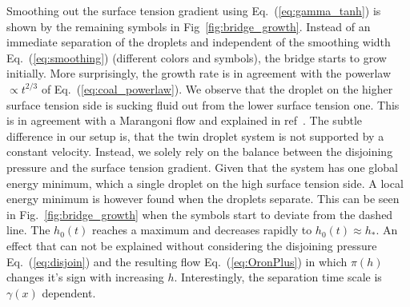 \documentclass[twocolumn,amsmath,amssymb,showpacs,pre,nofootinbib,superscriptaddress]{revtex4-1} %
\begin{document}
Smoothing out the surface tension gradient using Eq.~(\ref{eq:gamma_tanh}) is shown by the remaining symbols in Fig~\ref{fig:bridge_growth}.
Instead of an immediate separation of the droplets and independent of the smoothing width Eq.~(\ref{eq:smoothing}) (different colors and symbols), the bridge starts to grow initially.
More surprisingly, the growth rate is in agreement with the powerlaw $\propto t^{2/3}$ of Eq.~(\ref{eq:coal_powerlaw}).
We observe that the droplet on the higher surface tension side is sucking fluid out from the lower surface tension one.
This is in agreement with a Marangoni flow and explained in ref~\cite{PhysRevLett.109.066103}.
The subtle difference in our setup is, that the twin droplet system is not supported by a constant velocity.
Instead, we solely rely on the balance between the disjoining pressure and the surface tension gradient.
Given that the system has one global energy minimum, which a single droplet on the high surface tension side.
A local energy minimum is however found when the droplets separate.
This can be seen in Fig.~\ref{fig:bridge_growth} when the symbols start to deviate from the dashed line.
The $h_0(t)$ reaches a maximum and decreases rapidly to $h_0(t) \approx h_{\ast}$.
An effect that can not be explained without considering the disjoining pressure Eq.~(\ref{eq:disjoin}) and the resulting flow Eq.~(\ref{eq:OronPlus}) in which $\pi(h)$ changes it's sign with increasing $h$.
Interestingly, the separation time scale is $\gamma(x)$ dependent.
\end{document}

